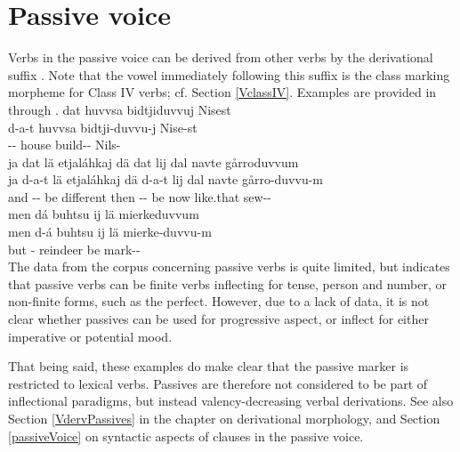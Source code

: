 \section{Passive voice}\label{passiveVinflection}
Verbs in the passive voice can be derived from other verbs by the derivational suffix . Note that the vowel immediately following this suffix is the class marking morpheme for Class IV verbs; cf. Section \ref{VclassIV}. 
Examples are provided in  through . 
\ea\label{passEx4}%
\glll	dat huvvsa bidtjiduvvuj Nisest\\
	d-a-t huvvsa bidtji-duvvu-j Nise-st\\
	-- house\BS{} build-- Nils-\\\nopagebreak
{}	
\z
\ea\label{passEx1a}%
\glll	ja dat lä etjaláhkaj dä dat lij dal navte gårroduvvum\\
	ja d-a-t lä etjaláhkaj dä d-a-t lij dal navte gårro-duvvu-m\\
	and -- be\BS{} different then -- be\BS{} now like.that sew--\\\nopagebreak
{}	
\z
\ea\label{passEx1b}%
\glll	men dá buhtsu ij lä mierkeduvvum\\
	men d-á buhtsu ij lä mierke-duvvu-m\\
	but -\BS{} reindeer\BS{} \BS{} be\BS{} mark--\\\nopagebreak
{}	
\z
The data from the corpus concerning passive verbs is quite limited, but indicates that passive verbs can be finite verbs inflecting for tense, person and number, or non-finite forms, such as the perfect. However, due to a lack of data, it is not clear whether passives can be used for progressive aspect, or inflect for either imperative or potential mood. 

That being said, these examples do make clear that the passive marker is restricted to lexical verbs. %
Passives are therefore not considered to be part of inflectional paradigms, but instead valency-decreasing verbal derivations. See also Section \ref{VdervPassives} in the chapter on derivational morphology, and Section \ref{passiveVoice} on syntactic aspects of clauses in the passive voice. 


